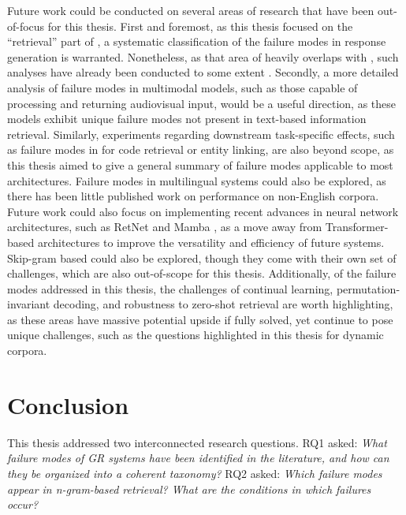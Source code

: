 Future work could be conducted on several areas of research that have been out-of-focus for this thesis. First and foremost, as this thesis focused on the ``retrieval'' part of , a systematic classification of the failure modes in response generation is warranted. Nonetheless, as that area of  heavily overlaps with , such analyses have already been conducted to some extent \cite{mindfulragfailure, ragseven}. Secondly, a more detailed analysis of failure modes in multimodal  models, such as those capable of processing and returning audiovisual input, would be a useful direction, as these models exhibit unique failure modes not present in text-based information retrieval. Similarly, experiments regarding downstream task-specific effects, such as failure modes in  for code retrieval or entity linking, are also beyond scope, as this thesis aimed to give a general summary of failure modes applicable to most  architectures. Failure modes in multilingual  systems \cite{multiling-gr} could also be explored, as there has been little published work on  performance on non-English corpora. Future work could also focus on implementing recent advances in neural network architectures, such as RetNet \cite{sun-retnet} and Mamba \cite{gu-mamba}, as a move away from Transformer-based architectures to improve the versatility and efficiency of future  systems. Skip-gram based  could also be explored, though they come with their own set of challenges, which are also out-of-scope for this thesis. Additionally, of the failure modes addressed in this thesis, the challenges of continual learning, permutation-invariant decoding, and robustness to zero-shot retrieval are worth highlighting, as these areas have massive potential upside if fully solved, yet continue to pose unique challenges, such as the questions highlighted in this thesis for dynamic corpora.

\section{Conclusion}

This thesis addressed two interconnected research questions. RQ1 asked: \textit{What failure modes of GR systems have been identified in the literature, and how can they be organized into a coherent taxonomy?} RQ2 asked: \textit{Which failure modes appear in n-gram-based retrieval? What are the conditions in which failures occur?}

